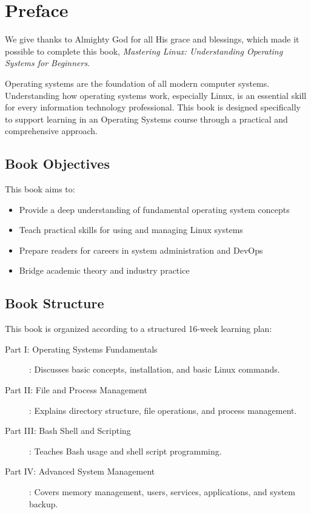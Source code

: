 
\chapter*{Preface}

We give thanks to Almighty God for all His grace and blessings, which made it possible to complete this book, \textit{Mastering Linux: Understanding Operating Systems for Beginners}.

Operating systems are the foundation of all modern computer systems. Understanding how operating systems work, especially Linux, is an essential skill for every information technology professional. This book is designed specifically to support learning in an Operating Systems course through a practical and comprehensive approach.

\section*{Book Objectives}

This book aims to:

\begin{itemize}
    \item Provide a deep understanding of fundamental operating system concepts
    \item Teach practical skills for using and managing Linux systems
    \item Prepare readers for careers in system administration and DevOps
    \item Bridge academic theory and industry practice
\end{itemize}

\section*{Book Structure}

This book is organized according to a structured 16-week learning plan:

\begin{description}
    \item[Part I: Operating Systems Fundamentals]: Discusses basic concepts, installation,
          and basic Linux commands.
    \item[Part II: File and Process Management]: Explains directory structure,
          file operations, and process management.
    \item[Part III: Bash Shell and Scripting]: Teaches Bash usage
          and shell script programming.
    \item[Part IV: Advanced System Management]: Covers memory management, users,
          services, applications, and system backup.
\end{description}

